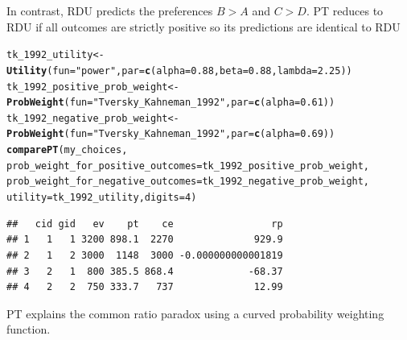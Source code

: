 \documentclass{article}\usepackage[]{graphicx}\usepackage[]{color}
\makeatletter
\newcommand{\hlnum}[1]{\textcolor[rgb]{0.686,0.059,0.569}{#1}}%
\newcommand{\hlstr}[1]{\textcolor[rgb]{0.192,0.494,0.8}{#1}}%
\newcommand{\hlstd}[1]{\textcolor[rgb]{0.345,0.345,0.345}{#1}}%
\newcommand{\hlkwb}[1]{\textcolor[rgb]{0.69,0.353,0.396}{#1}}%
\newcommand{\hlkwc}[1]{\textcolor[rgb]{0.333,0.667,0.333}{#1}}%
\newcommand{\hlkwd}[1]{\textcolor[rgb]{0.737,0.353,0.396}{\textbf{#1}}}%
\newenvironment{kframe}{%
 \def\at@end@of@kframe{}%
 \ifinner\ifhmode%
  \def\at@end@of@kframe{\end{minipage}}%
  \begin{minipage}{\columnwidth}%
 \fi\fi%
 \def\FrameCommand##1{\hskip\@totalleftmargin \hskip-\fboxsep
 \colorbox{shadecolor}{##1}\hskip-\fboxsep
     \hskip-\linewidth \hskip-\@totalleftmargin \hskip\columnwidth}%
 \MakeFramed {\advance\hsize-\width
   \@totalleftmargin\z@ \linewidth\hsize
   \@setminipage}}%
 {\par\unskip\endMakeFramed%
 \at@end@of@kframe}
\newenvironment{knitrout}{}{} %
\makeatother
\begin{document}
In contrast, RDU predicts the preferences $B > A$ and $C > D$. PT reduces to RDU if all outcomes are strictly positive so its predictions are identical to RDU

\begin{knitrout}
\color{fgcolor}\begin{kframe}
\begin{alltt}
\hlstd{tk_1992_utility} \hlkwb{<-} \hlkwd{Utility}\hlstd{(}\hlkwc{fun}\hlstd{=}\hlstr{"power"}\hlstd{,} \hlkwc{par}\hlstd{=}\hlkwd{c}\hlstd{(}\hlkwc{alpha}\hlstd{=}\hlnum{0.88}\hlstd{,} \hlkwc{beta}\hlstd{=}\hlnum{0.88}\hlstd{,} \hlkwc{lambda}\hlstd{=}\hlnum{2.25}\hlstd{))}
\hlstd{tk_1992_positive_prob_weight} \hlkwb{<-} \hlkwd{ProbWeight}\hlstd{(}\hlkwc{fun}\hlstd{=}\hlstr{"Tversky_Kahneman_1992"}\hlstd{,} \hlkwc{par}\hlstd{=}\hlkwd{c}\hlstd{(}\hlkwc{alpha}\hlstd{=}\hlnum{0.61}\hlstd{))}
\hlstd{tk_1992_negative_prob_weight} \hlkwb{<-} \hlkwd{ProbWeight}\hlstd{(}\hlkwc{fun}\hlstd{=}\hlstr{"Tversky_Kahneman_1992"}\hlstd{,} \hlkwc{par}\hlstd{=}\hlkwd{c}\hlstd{(}\hlkwc{alpha}\hlstd{=}\hlnum{0.69}\hlstd{))}
\hlkwd{comparePT}\hlstd{(my_choices,}
        \hlkwc{prob_weight_for_positive_outcomes}\hlstd{=tk_1992_positive_prob_weight,}
        \hlkwc{prob_weight_for_negative_outcomes}\hlstd{=tk_1992_negative_prob_weight,}
        \hlkwc{utility}\hlstd{=tk_1992_utility,} \hlkwc{digits}\hlstd{=}\hlnum{4}\hlstd{)}
\end{alltt}
\begin{verbatim}
##   cid gid   ev    pt    ce                 rp
## 1   1   1 3200 898.1  2270              929.9
## 2   1   2 3000  1148  3000 -0.000000000001819
## 3   2   1  800 385.5 868.4             -68.37
## 4   2   2  750 333.7   737              12.99
\end{verbatim}
\end{kframe}
\end{knitrout}


PT explains the common ratio paradox using a curved probability weighting function.
\end{document}

